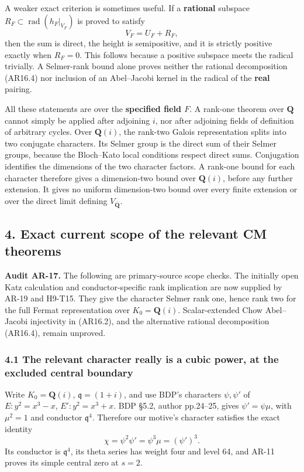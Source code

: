 \documentclass[11pt,a4paper]{article}
\begin{document}
A weaker exact criterion is sometimes useful. If a \textbf{rational}
subspace \(R_F\subset\operatorname{rad}(h_F|_{V_F})\) is proved to
satisfy \[
V_F=U_F+R_F,
\tag{AR16.4}
\] then the sum is direct, the height is semipositive, and it is
strictly positive exactly when \(R_F=0\). This follows because a
positive subspace meets the radical trivially. A Selmer-rank bound alone
proves neither the rational decomposition (AR16.4) nor inclusion of an
Abel--Jacobi kernel in the radical of the \textbf{real} pairing.

All these statements are over the \textbf{specified field \(F\)}. A
rank-one theorem over \(\mathbf Q\) cannot simply be applied after
adjoining \(i\), nor after adjoining fields of definition of arbitrary
cycles. Over \(\mathbf Q(i)\), the rank-two Galois representation splits
into two conjugate characters. Its Selmer group is the direct sum of
their Selmer groups, because the Bloch--Kato local conditions respect
direct sums. Conjugation identifies the dimensions of the two character
factors. A rank-one bound for each character therefore gives a
dimension-two bound over \(\mathbf Q(i)\), before any further extension.
It gives no uniform dimension-two bound over every finite extension or
over the direct limit defining \(V_{\overline{\mathbf Q}}\).

\subsection{4. Exact current scope of the relevant CM
theorems}\label{exact-current-scope-of-the-relevant-cm-theorems}

\textbf{Audit AR-17.} The following are primary-source scope checks. The
initially open Katz calculation and conductor-specific rank implication
are now supplied by AR-19 and H9-T15. They give the character Selmer
rank one, hence rank two for the full Fermat representation over
\(K_0=\mathbf Q(i)\). Scalar-extended Chow Abel--Jacobi injectivity in
(AR16.2), and the alternative rational decomposition (AR16.4), remain
unproved.

\subsubsection{4.1 The relevant character really is a cubic power, at
the excluded central
boundary}\label{the-relevant-character-really-is-a-cubic-power-at-the-excluded-central-boundary}

Write \(K_0=\mathbf Q(i)\), \(\mathfrak q=(1+i)\), and use BDP's
characters \(\psi,\psi'\) of \(E:y^2=x^3-x\), \(E':y^2=x^3+x\). BDP
§5.2, author pp.24--25, gives \(\psi'=\psi\mu\), with \(\mu^2=1\) and
conductor \(\mathfrak q^4\). Therefore our motive's character satisfies
the exact identity \[
\chi=\psi^2\psi'=\psi^3\mu=(\psi')^3.
\tag{AR17.1}
\] Its conductor is \(\mathfrak q^4\), its theta series has weight four
and level 64, and AR-11 proves its simple central zero at \(s=2\).
\end{document}
